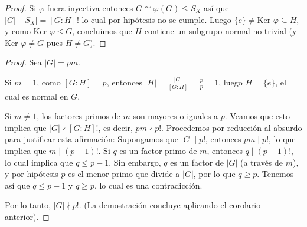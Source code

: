 
\begin{proof}
    Si $\varphi$ fuera inyectiva entonces $G \cong \varphi(G) \leq S_X$ así que $|G| \mid |S_X| = [G:H]!$ lo cual por hipótesis no se cumple.
    Luego $\{e\} \neq \text{Ker } \varphi \subseteq H$, y como $\text{Ker } \varphi \trianglelefteq G$, concluimos que $H$ contiene un subgrupo normal no trivial (y $\text{Ker } \varphi \neq G$ pues $H \neq G$).
\end{proof}


\begin{proof}
    Sea $|G|=pm$.
    
    Si $m=1$, como $[G:H]=p$, entonces $|H| = \frac{|G|}{[G:H]} = \frac{p}{p} = 1$, luego $H=\{e\}$, el cual es normal en $G$.
    
    Si $m \neq 1$, los factores primos de $m$ son mayores o iguales a $p$. Veamos que esto implica que $|G| \nmid [G:H]!$, es decir, $pm \nmid p!$.
    Procedemos por reducción al absurdo para justificar esta afirmación:
    Supongamos que $|G| \mid p!$, entonces $pm \mid p!$, lo que implica que $m \mid (p-1)!$.
    Si $q$ es un factor primo de $m$, entonces $q \mid (p-1)!$, lo cual implica que $q \leq p-1$.
    Sin embargo, $q$ es un factor de $|G|$ (a través de $m$), y por hipótesis $p$ es el menor primo que divide a $|G|$, por lo que $q \geq p$.
    Tenemos así que $q \leq p-1$ y $q \geq p$, lo cual es una contradicción.
    
    Por lo tanto, $|G| \nmid p!$.
    (La demostración concluye aplicando el corolario anterior).
\end{proof}
